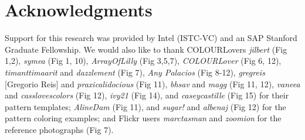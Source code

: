 \section*{Acknowledgments}

Support for this research was provided by Intel (ISTC-VC) and an SAP Stanford Graduate Fellowship.
We would also like to thank COLOURLovers \textit{jilbert} (Fig 1,2), \textit{symea} (Fig 1, 10), \textit{ArrayOfLilly} (Fig 3,5,7), \textit{COLOURLover} (Fig 6, 12), \textit{timanttimaarit} and \textit{dazzlement} (Fig 7), \textit{Any Palacios} (Fig 8-12), \textit{gregreis} [Gregorio Reis] and \textit{praxicalidocious} (Fig 11), \textit{bhsav} and \textit{magg} (Fig 11, 12), \textit{vaneea} and \textit{casslovescolors} (Fig 12), \textit{ivy21} (Fig 14), and \textit{caseycastille} (Fig 15) for their pattern templates; \textit{AlineDam} (Fig 11), and \textit{sugar!} and \textit{albenaj} (Fig 12) for the pattern coloring examples; and Flickr users \textit{marctasman} and \textit{zoomion} for the reference photographs (Fig 7).   
